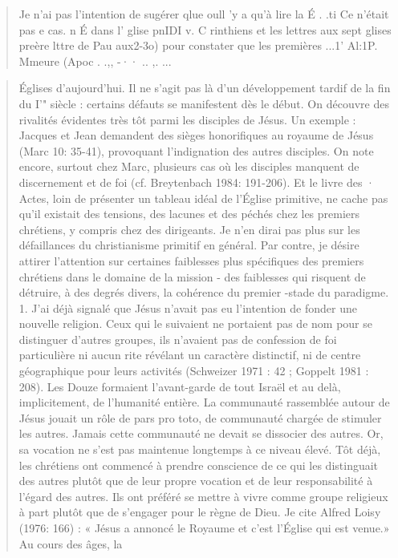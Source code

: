 \begin{quote}
    Je n'ai pas l'intention de sugérer qlue oull 'y a qu'à lire la
É . .ti Ce n'était pas e cas. n É
dans l' glise pnIDI v. C rinthiens et les lettres aux sept glises
preère lttre de Pau aux2-3o) pour constater que les premières
...1' Al:1P. Mmeure (Apoc . .,,  -·· .. ,. ...
\end{quote}

\begin{quote}
    Églises d'aujourd'hui. Il ne s'agit pas là d'un développement tardif
de la fin du I'" siècle : certains défauts se manifestent dès le début. On
découvre des rivalités évidentes très tôt parmi les disciples de Jésus. Un
exemple : Jacques et Jean demandent des sièges honorifiques au
royaume de Jésus (Marc 10: 35-41), provoquant l'indignation des
autres disciples. On note encore, surtout chez Marc, plusieurs cas où
les disciples manquent de discernement et de foi (cf. Breytenbach
1984: 191-206). Et le livre des · Actes, loin de présenter un tableau
idéal de l'Église primitive, ne cache pas qu'il existait des tensions, des
lacunes et des péchés chez les premiers chrétiens, y compris chez des
dirigeants.
Je n'en dirai pas plus sur les défaillances du christianisme primitif
en général. Par contre, je désire attirer l'attention sur certaines
faiblesses plus spécifiques des premiers chrétiens dans le domaine de
la mission - des faiblesses qui risquent de détruire, à des degrés divers,
la cohérence du premier -stade du paradigme.
1. J'ai déjà signalé que Jésus n'avait pas eu l'intention de fonder
une nouvelle religion. Ceux qui le suivaient ne portaient pas de nom
pour se distinguer d'autres groupes, ils n'avaient pas de confession de
foi particulière ni aucun rite révélant un caractère distinctif, ni de
centre géographique pour leurs activités (Schweizer 1971 : 42 ;
Goppelt 1981 : 208). Les Douze formaient l'avant-garde de tout Israël
et au delà, implicitement, de l'humanité entière. La communauté
rassemblée autour de Jésus jouait un rôle de pars pro toto, de
communauté chargée de stimuler les autres. Jamais cette communauté
ne devait se dissocier des autres.
Or, sa vocation ne s'est pas maintenue longtemps à ce niveau élevé.
Tôt déjà, les chrétiens ont commencé à prendre conscience de ce qui
les distinguait des autres plutôt que de leur propre vocation et de leur
responsabilité à l'égard des autres. Ils ont préféré se mettre à vivre
comme groupe religieux à part plutôt que de s'engager pour le règne
de Dieu. Je cite Alfred Loisy (1976: 166) : « Jésus a annoncé le
Royaume et c'est l'Église qui est venue.» Au cours des âges, la

\end{quote}
